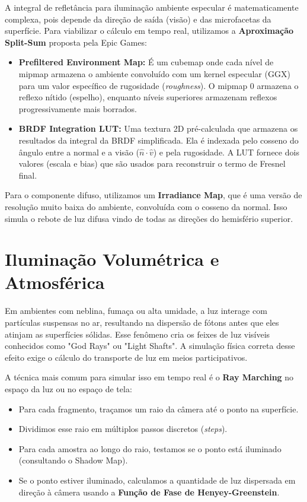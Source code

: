 A integral de refletância para iluminação ambiente especular é matematicamente complexa, pois depende da direção de saída (visão) e das microfacetas da superfície. Para viabilizar o cálculo em tempo real, utilizamos a \textbf{Aproximação Split-Sum} proposta pela Epic Games:

\begin{itemize}
    \item \textbf{Prefiltered Environment Map:} É um cubemap onde cada nível de mipmap armazena o ambiente convoluído com um kernel especular (GGX) para um valor específico de rugosidade (\textit{roughness}). O mipmap 0 armazena o reflexo nítido (espelho), enquanto níveis superiores armazenam reflexos progressivamente mais borrados.
    \item \textbf{BRDF Integration LUT:} Uma textura 2D pré-calculada que armazena os resultados da integral da BRDF simplificada. Ela é indexada pelo cosseno do ângulo entre a normal e a visão ($\hat{n} \cdot \hat{v}$) e pela rugosidade. A LUT fornece dois valores (escala e bias) que são usados para reconstruir o termo de Fresnel final.
\end{itemize}

Para o componente difuso, utilizamos um \textbf{Irradiance Map}, que é uma versão de resolução muito baixa do ambiente, convoluída com o cosseno da normal. Isso simula o rebote de luz difusa vindo de todas as direções do hemisfério superior.

\section{Iluminação Volumétrica e Atmosférica}

Em ambientes com neblina, fumaça ou alta umidade, a luz interage com partículas suspensas no ar, resultando na dispersão de fótons antes que eles atinjam as superfícies sólidas. Esse fenômeno cria os feixes de luz visíveis conhecidos como "God Rays" ou "Light Shafts". A simulação física correta desse efeito exige o cálculo do transporte de luz em meios participativos.

A técnica mais comum para simular isso em tempo real é o \textbf{Ray Marching} no espaço da luz ou no espaço de tela:
\begin{itemize}
    \item Para cada fragmento, traçamos um raio da câmera até o ponto na superfície.
    \item Dividimos esse raio em múltiplos passos discretos (\textit{steps}).
    \item Para cada amostra ao longo do raio, testamos se o ponto está iluminado (consultando o Shadow Map).
    \item Se o ponto estiver iluminado, calculamos a quantidade de luz dispersada em direção à câmera usando a \textbf{Função de Fase de Henyey-Greenstein}.
\end{itemize}

